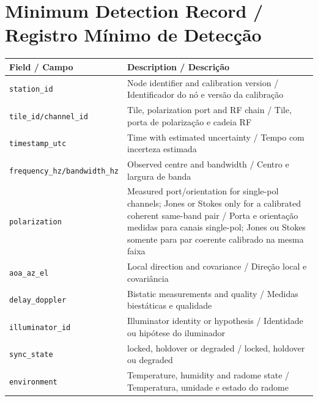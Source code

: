 \chapter{Minimum Detection Record / Registro Mínimo de Detecção}

\begin{longtable}{p{}p{}}
\toprule
\textbf{Field / Campo} & \textbf{Description / Descrição}\\
\midrule
\texttt{station\_id} & Node identifier and calibration version / Identificador do nó e versão da calibração\\
\texttt{tile\_id/channel\_id} & Tile, polarization port and RF chain / Tile, porta de polarização e cadeia RF\\
\texttt{timestamp\_utc} & Time with estimated uncertainty / Tempo com incerteza estimada\\
\texttt{frequency\_hz/bandwidth\_hz} & Observed centre and bandwidth / Centro e largura de banda\\
\texttt{polarization} & Measured port/orientation for single-pol channels; Jones or Stokes only for a calibrated coherent same-band pair / Porta e orientação medidas para canais single-pol; Jones ou Stokes somente para par coerente calibrado na mesma faixa\\
\texttt{aoa\_az\_el} & Local direction and covariance / Direção local e covariância\\
\texttt{delay\_doppler} & Bistatic measurements and quality / Medidas biestáticas e qualidade\\
\texttt{illuminator\_id} & Illuminator identity or hypothesis / Identidade ou hipótese do iluminador\\
\texttt{sync\_state} & locked, holdover or degraded / locked, holdover ou degraded\\
\texttt{environment} & Temperature, humidity and radome state / Temperatura, umidade e estado do radome\\
\bottomrule
\end{longtable}
